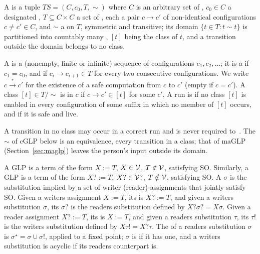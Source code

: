 \begin{definition}
\label{def:ts}
A  is a tuple $TS = (C, c_0, T, {\sim})$ where $C$ is an arbitrary set of , $c_0 \in C$ a designated , $T \subseteq C \times C$ a set of , each a pair $c \rightarrow c'$ of non-identical configurations $c \ne c' \in C$, and ${\sim}$ a  on $T$, symmetric and transitive; its domain $\{t \in T : t \sim t\}$ is partitioned into countably many , $[t]$ being the class of $t$, and a transition outside the domain belongs to no class.

A  is a (nonempty, finite or infinite) sequence of configurations $c_1, c_2, \ldots$; it is a  if $c_1 = c_0$, and  if $c_i \rightarrow c_{i+1} \in T$ for every two consecutive configurations. We write $c \xrightarrow{*} c'$ for the existence of a safe computation from $c$ to $c'$ (empty if $c = c'$). A class $[t] \in T/{\sim}$ is  in $c$ if $c \rightarrow c' \in [t]$ for some $c'$. A run is  if no class $[t]$ is enabled in every configuration of some suffix in which no member of $[t]$ occurs, and  if it is safe and live.
\end{definition}

A transition in no class may occur in a correct run and is never required to~\cite{lewis2026volitional}. The ${\sim}$ of cGLP below is an equivalence, every transition in a class; that of maGLP (Section~\ref{sec:maglp}) leaves the person's input outside its domain.

\begin{definition}
\label{def:writers-assignment}
A GLP  is a term of the form $X := T$, $X\in\mathcal{V}$, $T\notin\mathcal{V}$, satisfying SO. Similarly, a GLP  is a term of the form $X? := T$, $X?\in\mathcal{V}?$, $T\notin\mathcal{V}$, satisfying SO. A  $\sigma$ is the substitution implied by a set of writer (reader) assignments that jointly satisfy SO. Given a writers assignment $X := T$, its  is $X? := T$, and given a writers substitution $\sigma$, its  $\sigma?$ is the readers substitution defined by $X?\sigma? = X\sigma$. Given a reader assignment $X? := T$, its  is $X := T$, and given a readers substitution $\tau$, its  $\tau!$ is the writers substitution defined by $X\tau! = X?\tau$. The  of a readers substitution $\sigma$ is $\sigma^\star = \sigma \cup \sigma!$, applied to a fixed point; $\sigma$ is  if it has one, and a writers substitution is acyclic if its readers counterpart is.
\end{definition}


